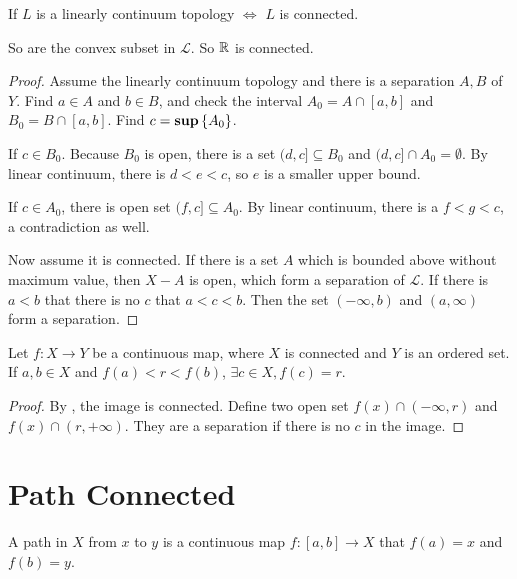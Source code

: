 \begin{theorem}
    If $L$ is a linearly continuum topology $\Leftrightarrow$ $L$ is connected. 
    
    So are the convex subset in $\mathcal{L}$. So $\mathbb{R}$ is connected.
\end{theorem}
\begin{proof}
    Assume the linearly continuum topology and there is a separation $A,B$ of $Y$. Find $a \in A$ and $b \in B$, and check the interval $A_0 = A \cap [a,b]$ and $B_0 = B \cap [a,b]$. Find $c = \mathbf{sup} \set{A_0}$. 
    
    If $c \in B_0$. Because $B_0$ is open, there is a set $(d,c] \subseteq B_0$ and $(d,c] \cap A_0 = \emptyset$. By linear continuum, there is $d < e < c$, so $e$ is a smaller upper bound.
    
    If $c \in A_0$, there is open set $(f,c] \subseteq A_0$. By linear continuum, there is a $f < g < c$, a contradiction as well.
    
    Now assume it is connected. If there is a set $A$ which is bounded above without maximum value, then $X - A$ is open, which form a separation of $\mathcal{L}$. If there is $a < b$ that there is no $c$ that $a < c < b$. Then the set $(-\infty, b)$ and $(a, \infty)$ form a separation.
\end{proof}


\begin{theorem}
    Let $f : X \rightarrow Y$ be a continuous map, where $X$ is connected and $Y$ is an ordered set. If $a,b \in X$ and $f(a) < r < f(b)$, $\exists c \in X, f(c) = r$.
\end{theorem}
\begin{proof}
    By , the image is connected. Define two open set $f(x) \cap (-\infty, r)$ and $f(x) \cap (r, +\infty)$. They are a separation if there is no $c$ in the image.
\end{proof}



\section{Path Connected}

\begin{definition}
    A path in $X$ from $x$ to $y$ is a continuous map $f: [a,b] \rightarrow X$ that $f(a) = x$ and $f(b) = y$. 
\end{definition}

